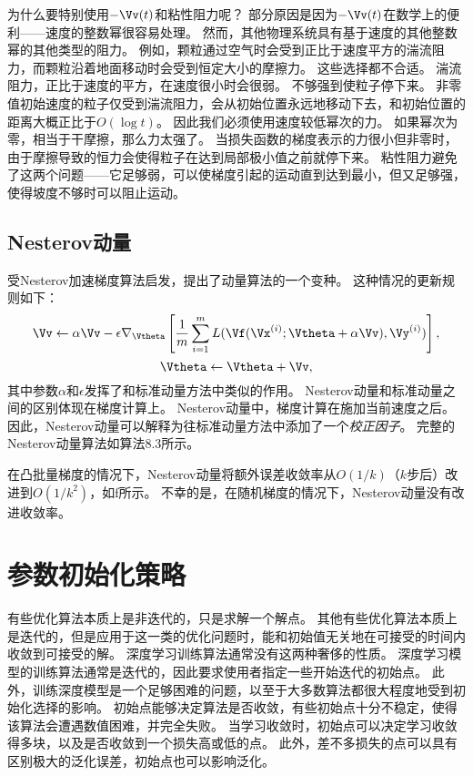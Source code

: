 为什么要特别使用$-\Vv(t)$和粘性阻力呢？
部分原因是因为$-\Vv(t)$在数学上的便利——速度的整数幂很容易处理。
然而，其他物理系统具有基于速度的其他整数幂的其他类型的阻力。
例如，颗粒通过空气时会受到正比于速度平方的湍流阻力，而颗粒沿着地面移动时会受到恒定大小的摩擦力。
这些选择都不合适。
湍流阻力，正比于速度的平方，在速度很小时会很弱。
不够强到使粒子停下来。
非零值初始速度的粒子仅受到湍流阻力，会从初始位置永远地移动下去，和初始位置的距离大概正比于$O(\log t)$。
因此我们必须使用速度较低幂次的力。
如果幂次为零，相当于干摩擦，那么力太强了。
当损失函数的梯度表示的力很小但非零时，由于摩擦导致的恒力会使得粒子在达到局部极小值之前就停下来。
粘性阻力避免了这两个问题——它足够弱，可以使梯度引起的运动直到达到最小，但又足够强，使得坡度不够时可以阻止运动。

\subsection{Nesterov动量}
\label{sec:nesterov_momentum}
受Nesterov加速梯度算法\citep{Nesterov83b,Nesterov03}启发，\cite{sutskeverimportance}提出了动量算法的一个变种。
这种情况的更新规则如下：
\begin{equation}
    \Vv \leftarrow \alpha\Vv - \epsilon \nabla_{\Vtheta} \left[
    \frac{1}{m} \sum_{i=1}^m L( \Vf(\Vx^{(i)}; \Vtheta + \alpha \Vv), \Vy^{(i)} )
 \right],
\end{equation}
\begin{equation}
    \Vtheta \leftarrow \Vtheta + \Vv ,
\end{equation}
其中参数$\alpha$和$\epsilon$发挥了和标准动量方法中类似的作用。 
Nesterov动量和标准动量之间的区别体现在梯度计算上。
Nesterov动量中，梯度计算在施加当前速度之后。
因此，Nesterov动量可以解释为往标准动量方法中添加了一个\emph{校正因子}。
完整的Nesterov动量算法如算法8.3所示。


在凸批量梯度的情况下，Nesterov动量将额外误差收敛率从$O(1/k)$（$k$步后）改进到$O(1/k^2)$，如\cite{Nesterov83b}f所示。
不幸的是，在随机梯度的情况下，Nesterov动量没有改进收敛率。

\section{参数初始化策略}
\label{sec:parameter_initialization_strategies}
有些优化算法本质上是非迭代的，只是求解一个解点。
其他有些优化算法本质上是迭代的，但是应用于这一类的优化问题时，能和初始值无关地在可接受的时间内收敛到可接受的解。
深度学习训练算法通常没有这两种奢侈的性质。
深度学习模型的训练算法通常是迭代的，因此要求使用者指定一些开始迭代的初始点。
此外，训练深度模型是一个足够困难的问题，以至于大多数算法都很大程度地受到初始化选择的影响。
初始点能够决定算法是否收敛，有些初始点十分不稳定，使得该算法会遭遇数值困难，并完全失败。
当学习收敛时，初始点可以决定学习收敛得多块，以及是否收敛到一个损失高或低的点。
此外，差不多损失的点可以具有区别极大的泛化误差，初始点也可以影响泛化。

